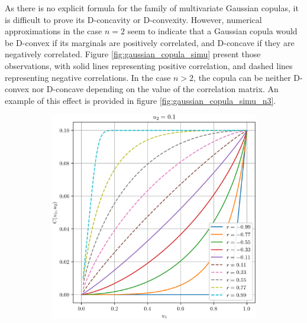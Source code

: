As there is no explicit formula for the family of multivariate Gaussian copulas, it is difficult to prove its D-concavity or D-convexity. However, numerical approximations in the case $n=2$ seem to indicate that a Gaussian copula would be D-convex if its marginals are positively correlated, and D-concave if they are negatively correlated. Figure \ref{fig:gaussian_copula_simu} present those observations, with solid lines representing positive correlation, and dashed lines representing negative correlations. In the case $n>2$, the copula can be neither D-convex nor D-concave depending on the value of the correlation matrix. An example of this effect is provided in figure \ref{fig:gaussian_copula_simu_n3}.
\begin{figure}
    \centering
    \begin{subfigure}{0.4\linewidth}
        \centering
        \includegraphics[width=\linewidth]{Images/Guassian_copula/gaussian_copula_0.png}
    \end{subfigure}\hfill
    \begin{subfigure}{0.4\linewidth}
        \centering

\end{subfigure}
\end{figure}
